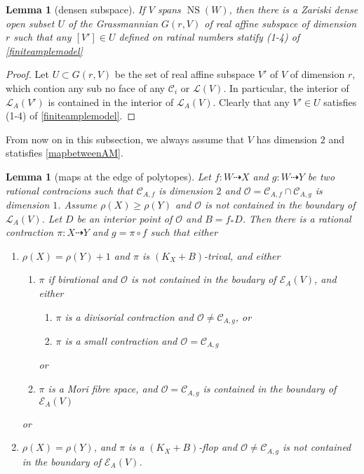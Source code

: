 \documentclass{article}
\newtheorem{lem}[defn]{Lemma}
\begin{document}
\begin{lem}[densen subspace]\label{subspace}
  If $V$ spans  $\operatorname{NS}(W)$, then there is a Zariski dense open subset $U$ of the Grassmannian $G(r,V)$ of real affine subspace of dimension $r$ such that any  $[V']\in U$ defined on ratinal numbers statify (1-4) of \ref{finiteamplemodel} 
\end{lem}
\begin{proof}
 Let $U \subset G(r,V) $ be the set of real affine subspace  $V'$ of $V$ of dimension $r$, which contion any sub no face of any $\mathcal{C}_{i}$ or $\mathcal{L}(V)$. In particular, the interior of  $\mathcal{L}_{A}(V')$ is contained in the interior of $\mathcal{L}_{A}(V)$. Clearly that any $V'\in U$ satisfies (1-4) of \ref{finiteamplemodel}. \end{proof}
From now on in this subsection, we always assume that $V$ has dimension $2$ and statisfies \ref{mapbetweenAM}.  
\begin{lem}[maps at the edge of polytopes]
Let $ f:W\dashrightarrow X $ and $ g:W\dashrightarrow  Y $ be two rational contracions such that $ \mathcal{C}_{A,f} $ is dimension $ 2 $ and $ \mathcal{O}=\mathcal{C}_{A,f}\cap \mathcal{C}_{A,g} $ is dimension $ 1 $. Assume $ \rho(X)\geqslant \rho(Y) $ and $ \mathcal{O} $ is not contained in the boundary of $ \mathcal{L}_{A}(V) $. Let $ D $ be an interior point of $ \mathcal{O} $ and $ B=f_*D $. Then there is a rational contraction $ \pi:X\dashrightarrow Y $ and $ g=\pi\circ f $ such that either
\begin{enumerate}[1]
  \item $ \rho(X)=\rho(Y)+1 $ and $ \pi  $ is $ (K_X+B) $-trival, and either
  \begin{enumerate}[a]
    \item $ \pi $ if birational and $ \mathcal{O} $ is not contained in the boudary of $ \mathcal{E}_A(V) $, and either
    \begin{enumerate}[i]
      \item $ \pi $ is a divisorial contraction and $ \mathcal{O}\neq \mathcal{C}_{A,g} $, or
      \item $ \pi $ is a small contraction and $ \mathcal{O}= \mathcal{C}_{A,g} $
    \end{enumerate}
    or
    \item $ \pi $ is a Mori fibre space, and $ \mathcal{O}=\mathcal{C}_{A,g} $ is contained in the boundary of $ \mathcal{E}_{A}(V) $
  \end{enumerate}
or
  \item $ \rho(X)=\rho(Y) $, and $ \pi $ is  a $ (K_X+B) $-flop and $ \mathcal{O}\neq\mathcal{C}_{A,g} $ is not contained in the boundary of $ \mathcal{E}_A(V) $.
  \end{enumerate}
\end{lem}
\end{document}
